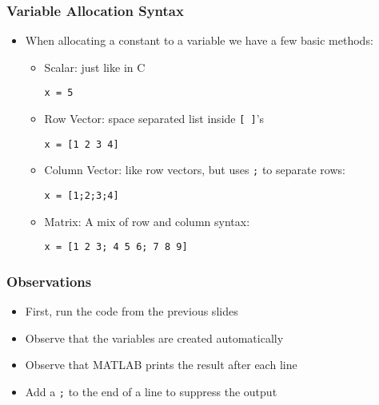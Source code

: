 \documentclass[14pt]{beamer}
\begin{document}
\begin{frame}[fragile]
\frametitle{Variable Allocation Syntax}
\begin{itemize}
\item When allocating a constant to a variable we have a few basic methods:
	\begin{itemize}
		\item Scalar: just like in C
			\begin{lstlisting}[style=pseudo]
x = 5
\end{lstlisting}
		\item Row Vector: space separated list inside \texttt{[ ]}'s
\begin{lstlisting}[style=pseudo]
x = [1 2 3 4]		
\end{lstlisting}
		\item Column Vector: like row vectors, but uses \texttt{;} to separate rows:
\begin{lstlisting}[style=pseudo]
x = [1;2;3;4]
\end{lstlisting}
		\item Matrix: A mix of row and column syntax:
\begin{lstlisting}[style=pseudo]
x = [1 2 3; 4 5 6; 7 8 9]
\end{lstlisting}
	\end{itemize}
\end{itemize}
\end{frame}

\begin{frame}
\frametitle{Observations}
\begin{itemize}
\item First, run the code from the previous slides
\pause
\item Observe that the variables are created automatically
\pause
\item Observe that MATLAB prints the result after each line
\item Add a \texttt{;} to the end of a line to suppress the output
\end{itemize}
\end{frame}
\end{document}
